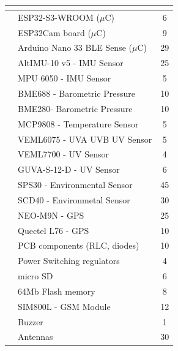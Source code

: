 \documentclass[11pt]{article}
\begin{document}
\begin{table}[htbp]
\centering
{}
\begin{tabular}{>{\centering\arraybackslash}p{4.5cm}>{\centering\arraybackslash}lc}
\rowcolor{DeepSkyBlue4}
\hline
\multicolumn{1}{c}{\textbf{\color{white!50}{Category}}}& \multicolumn{1}{c}{\textbf{\color{white!50}{Cost Item}}} & \textbf{\color{white!50}{Cost \texteuro}} \\
\hline
\multicolumn{1}{l}{Hardware Parts (383\texteuro)}& ESP32-S3-WROOM ($\mu$C) & 6 \\
& \cellcolor{LightCyan1!50}ESP32Cam board ($\mu$C)& \cellcolor{LightCyan1!50}9 \\
& Arduino Nano 33 BLE Sense ($\mu$C)& 29 \\
& \cellcolor{LightCyan1!50}AltIMU-10 v5 - IMU Sensor & \cellcolor{LightCyan1!50}25 \\
& MPU 6050 - IMU Sensor & 5 \\
& \cellcolor{LightCyan1!50}BME688 - Barometric Pressure & \cellcolor{LightCyan1!50}10 \\
& BME280- Barometric Pressure & 10 \\
& \cellcolor{LightCyan1!50}MCP9808 - Temperature Sensor & \cellcolor{LightCyan1!50}5 \\
& VEML6075 - UVA UVB UV Sensor & 5 \\
& \cellcolor{LightCyan1!50}VEML7700 - UV Sensor & \cellcolor{LightCyan1!50}4 \\
& GUVA-S-12-D - UV Sensor & 6 \\
& \cellcolor{LightCyan1!50}SPS30 - Environmental Sensor & \cellcolor{LightCyan1!50}45 \\
& SCD40 - Environmetal Sensor & 30 \\
& \cellcolor{LightCyan1!50}NEO-M9N - GPS & \cellcolor{LightCyan1!50}25 \\
& Quectel L76 - GPS & 10 \\
& \cellcolor{LightCyan1!50}PCB components (RLC, diodes) & \cellcolor{LightCyan1!50}10 \\
& Power Switching regulators & 4 \\
& \cellcolor{LightCyan1!50}micro SD & \cellcolor{LightCyan1!50}6 \\
& 64Mb Flash memory & 8 \\
& \cellcolor{LightCyan1!50}SIM800L - GSM Module & \cellcolor{LightCyan1!50}12 \\
& Buzzer & 1 \\
& \cellcolor{LightCyan1!50}Antennas & \cellcolor{LightCyan1!50}30 \\

\end{tabular}
\end{table}
\end{document}
